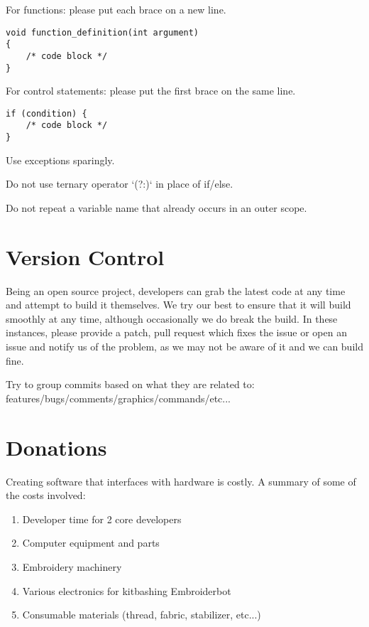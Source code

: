 For functions: please put each brace on a new line.

\begin{lstlisting}
void function_definition(int argument)
{
    /* code block */
}
\end{lstlisting}

For control statements: please put the first brace on the same line.

\begin{lstlisting}
if (condition) {
    /* code block */    
}
\end{lstlisting}

Use exceptions sparingly.

Do not use ternary operator `(?:)` in place of if/else.

Do not repeat a variable name that already occurs in an outer scope.

\section{Version Control}

Being an open source project, developers can grab the latest code at any time and attempt to build it themselves. We try our best to ensure that it will build smoothly at any time, although occasionally we do break the build. In these instances, please provide a patch, pull request which fixes the issue or open an issue and notify us of the problem, as we may not be aware of it and we can build fine.

Try to group commits based on what they are related to: features/bugs/comments/graphics/commands/etc...

\section{Donations}

Creating software that interfaces with hardware is costly. A summary of some of the costs involved:

\begin{enumerate}
\item Developer time for 2 core developers
\item Computer equipment and parts
\item Embroidery machinery
\item Various electronics for kitbashing Embroiderbot
\item Consumable materials (thread, fabric, stabilizer, etc...)
\end{enumerate}


